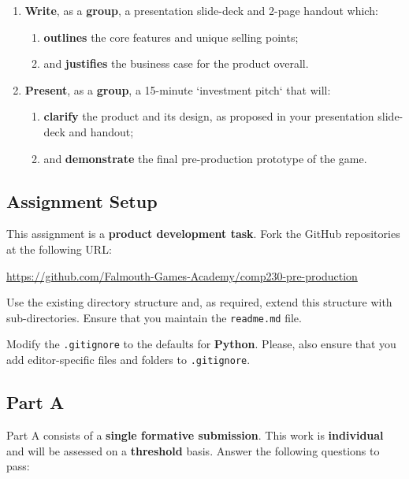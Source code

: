 \documentclass{../fal_assignment}
\begin{document}
\begin{enumerate}[label=(\Alph*)]
\begin{enumerate}[label=\roman*.]
	\end{enumerate}
    \item \textbf{Write}, as a \textbf{group}, a presentation slide-deck and 2-page handout which:
    	\begin{enumerate}[label=\roman*.]
    		\item \textbf{outlines} the core features and unique selling points;
    		\item and \textbf{justifies} the business case for the product overall.
	\end{enumerate}
    \item \textbf{Present}, as a \textbf{group}, a 15-minute `investment pitch` that will:
    	\begin{enumerate}[label=\roman*.]
    		\item \textbf{clarify} the product and its design, as proposed in your presentation slide-deck and handout;
    		\item and \textbf{demonstrate} the final pre-production prototype of the game.
	\end{enumerate}
\end{enumerate}

\subsection*{Assignment Setup}

This assignment is a \textbf{product development task}. Fork the GitHub repositories at the following URL:

\indent \url{https://github.com/Falmouth-Games-Academy/comp230-pre-production}

Use the existing directory structure and, as required, extend this structure with sub-directories. Ensure that you maintain the \texttt{readme.md} file.

Modify the \texttt{.gitignore} to the defaults for \textbf{Python}. Please, also ensure that you add editor-specific files and folders to \texttt{.gitignore}. 

\subsection*{Part A}

Part A consists of a \textbf{single formative submission}. This work is \textbf{individual} and will be assessed on a \textbf{threshold} basis. Answer the following questions to pass:
\end{document}
